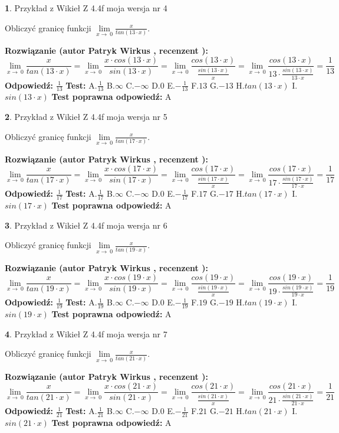 \documentclass[12pt, a4paper]{article}
\theoremstyle{definition} %
\newtheorem{zad}{}
\newcommand{\zadStart}[1]{\begin{zad}#1\newline}
\newcommand{\zadStop}{\end{zad}}
\newcommand{\rozwStart}[2]{\noindent \textbf{Rozwiązanie (autor #1 , recenzent #2): }\newline}
\newcommand{\rozwStop}{\newline}
\newcommand{\odpStart}{\noindent \textbf{Odpowiedź:}\newline}
\newcommand{\odpStop}{\newline}
\newcommand{\testStart}{\noindent \textbf{Test:}\newline}
\newcommand{\testStop}{\newline}
\newcommand{\kluczStart}{\noindent \textbf{Test poprawna odpowiedź:}\newline}
\newcommand{\kluczStop}{\newline}
\begin{document}
\zadStart{Przykład z Wikieł Z 4.4f moja wersja nr 4}


Obliczyć granicę funkcji $\lim\limits_{x\to\ 0}\frac{x}{tan(13 \cdot x)}$.
\zadStop
\rozwStart{Patryk Wirkus}{}
$$\lim\limits_{x\to\ 0}\frac{x}{tan(13 \cdot x)}=\lim\limits_{x\to\ 0}\frac{x \cdot cos(13 \cdot x)}{sin(13 \cdot x)}=\lim\limits_{x\to\ 0}\frac{cos(13 \cdot x)}{\frac{sin(13 \cdot x)}{x}}=\lim\limits_{x\to\ 0}\frac{cos(13 \cdot x)}{13 \cdot \frac{sin(13 \cdot x)}{13 \cdot x}} = \frac{1}{13}$$
\rozwStop
\odpStart
$\frac{1}{13}$
\odpStop
\testStart
A.$\frac{1}{13}$
B.$\infty$
C.$-\infty$
D.$0$
E.$-\frac{1}{13}$
F.$13$
G.$-13$
H.$tan(13 \cdot x)$
I.$sin(13 \cdot x)$
\testStop
\kluczStart
A
\kluczStop



\zadStart{Przykład z Wikieł Z 4.4f moja wersja nr 5}


Obliczyć granicę funkcji $\lim\limits_{x\to\ 0}\frac{x}{tan(17 \cdot x)}$.
\zadStop
\rozwStart{Patryk Wirkus}{}
$$\lim\limits_{x\to\ 0}\frac{x}{tan(17 \cdot x)}=\lim\limits_{x\to\ 0}\frac{x \cdot cos(17 \cdot x)}{sin(17 \cdot x)}=\lim\limits_{x\to\ 0}\frac{cos(17 \cdot x)}{\frac{sin(17 \cdot x)}{x}}=\lim\limits_{x\to\ 0}\frac{cos(17 \cdot x)}{17 \cdot \frac{sin(17 \cdot x)}{17 \cdot x}} = \frac{1}{17}$$
\rozwStop
\odpStart
$\frac{1}{17}$
\odpStop
\testStart
A.$\frac{1}{17}$
B.$\infty$
C.$-\infty$
D.$0$
E.$-\frac{1}{17}$
F.$17$
G.$-17$
H.$tan(17 \cdot x)$
I.$sin(17 \cdot x)$
\testStop
\kluczStart
A
\kluczStop



\zadStart{Przykład z Wikieł Z 4.4f moja wersja nr 6}


Obliczyć granicę funkcji $\lim\limits_{x\to\ 0}\frac{x}{tan(19 \cdot x)}$.
\zadStop
\rozwStart{Patryk Wirkus}{}
$$\lim\limits_{x\to\ 0}\frac{x}{tan(19 \cdot x)}=\lim\limits_{x\to\ 0}\frac{x \cdot cos(19 \cdot x)}{sin(19 \cdot x)}=\lim\limits_{x\to\ 0}\frac{cos(19 \cdot x)}{\frac{sin(19 \cdot x)}{x}}=\lim\limits_{x\to\ 0}\frac{cos(19 \cdot x)}{19 \cdot \frac{sin(19 \cdot x)}{19 \cdot x}} = \frac{1}{19}$$
\rozwStop
\odpStart
$\frac{1}{19}$
\odpStop
\testStart
A.$\frac{1}{19}$
B.$\infty$
C.$-\infty$
D.$0$
E.$-\frac{1}{19}$
F.$19$
G.$-19$
H.$tan(19 \cdot x)$
I.$sin(19 \cdot x)$
\testStop
\kluczStart
A
\kluczStop



\zadStart{Przykład z Wikieł Z 4.4f moja wersja nr 7}


Obliczyć granicę funkcji $\lim\limits_{x\to\ 0}\frac{x}{tan(21 \cdot x)}$.
\zadStop
\rozwStart{Patryk Wirkus}{}
$$\lim\limits_{x\to\ 0}\frac{x}{tan(21 \cdot x)}=\lim\limits_{x\to\ 0}\frac{x \cdot cos(21 \cdot x)}{sin(21 \cdot x)}=\lim\limits_{x\to\ 0}\frac{cos(21 \cdot x)}{\frac{sin(21 \cdot x)}{x}}=\lim\limits_{x\to\ 0}\frac{cos(21 \cdot x)}{21 \cdot \frac{sin(21 \cdot x)}{21 \cdot x}} = \frac{1}{21}$$
\rozwStop
\odpStart
$\frac{1}{21}$
\odpStop
\testStart
A.$\frac{1}{21}$
B.$\infty$
C.$-\infty$
D.$0$
E.$-\frac{1}{21}$
F.$21$
G.$-21$
H.$tan(21 \cdot x)$
I.$sin(21 \cdot x)$
\testStop
\kluczStart
A
\kluczStop
\end{document}
